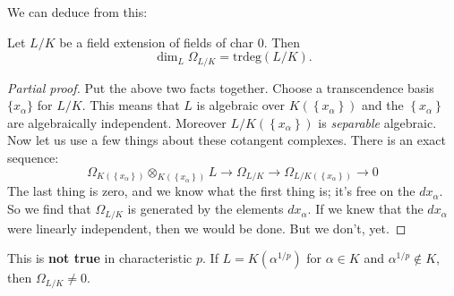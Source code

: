 We can deduce from this:
\begin{corollary} 
Let $L/K$ be a field extension of fields of char 0. Then 
\[ \dim_L \Omega_{L/K} = \mathrm{trdeg}(L/K).  \]
\end{corollary} 
\begin{proof}[Partial proof] 
Put the above two facts together. Choose a transcendence basis $\{x_\alpha\}$
for $L/K$. This means that $L$ is algebraic over $K(\left\{x_\alpha\right\})$
and the $\left\{x_\alpha\right\}$ are algebraically independent.
Moreover $L/K(\left\{x_\alpha\right\})$ is \emph{separable} algebraic.  Now let
us use a few things about these cotangent complexes. There is an exact sequence:
\[ \Omega_{K(\left\{x_\alpha\right\})}
\otimes_{K(\left\{x_\alpha\right\})} L \to \Omega_{L/K} \to \Omega_{L/K(\left\{x_\alpha\right\})}  \to 0 \]
The last thing is zero, and we know what the first thing is; it's free on the
$dx_\alpha$. So we find that $\Omega_{L/K}$ is generated by
the elements $dx_\alpha$. If we knew that the $dx_\alpha$ were linearly
independent, then we would be done. But we don't, yet. 
\end{proof}

This is \textbf{not true} in characteristic $p$. If $L = K(\alpha^{1/p})$ for
$\alpha \in K$ and $\alpha^{1/p} \notin K$, then $\Omega_{L/K} \neq 0$.


